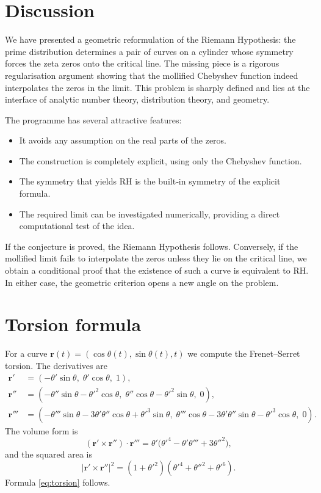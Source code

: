 \documentclass[12pt,a4paper]{article}
\begin{document}
\section{Discussion}

We have presented a geometric reformulation of the Riemann Hypothesis: the prime
distribution determines a pair of curves on a cylinder whose symmetry forces the
zeta zeros onto the critical line.  The missing piece is a rigorous regularisation
argument showing that the mollified Chebyshev function indeed interpolates the
zeros in the limit.  This problem is sharply defined and lies at the interface of
analytic number theory, distribution theory, and geometry.

The programme has several attractive features:
\begin{itemize}
\item It avoids any assumption on the real parts of the zeros.
\item The construction is completely explicit, using only the Chebyshev function.
\item The symmetry that yields RH is the built‑in symmetry of the explicit formula.
\item The required limit can be investigated numerically, providing a direct
      computational test of the idea.
\end{itemize}

If the conjecture is proved, the Riemann Hypothesis follows.  Conversely, if the
mollified limit fails to interpolate the zeros unless they lie on the critical
line, we obtain a conditional proof that the existence of such a curve is
equivalent to RH.  In either case, the geometric criterion opens a new angle
on the problem.

\appendix

\section{Torsion formula}

For a curve \(\mathbf{r}(t)=(\cos\theta(t),\sin\theta(t),t)\) we compute the
Frenet–Serret torsion.  The derivatives are
\begin{align*}
\mathbf{r}' &= (-\theta'\sin\theta,\; \theta'\cos\theta,\; 1),\\
\mathbf{r}'' &= (-\theta''\sin\theta - \theta'^2\cos\theta,\;
                 \theta''\cos\theta - \theta'^2\sin\theta,\; 0),\\
\mathbf{r}''' &= (-\theta'''\sin\theta - 3\theta'\theta''\cos\theta
                  + \theta'^3\sin\theta,\;
                  \theta'''\cos\theta - 3\theta'\theta''\sin\theta
                  - \theta'^3\cos\theta,\; 0).
\end{align*}
The volume form is
\[
(\mathbf{r}'\times\mathbf{r}'')\cdot\mathbf{r}''' =
\theta' \bigl( \theta'^4 - \theta'\theta''' + 3\theta''^2 \bigr),
\]
and the squared area is
\[
|\mathbf{r}'\times\mathbf{r}''|^2 =
(1+\theta'^2)(\theta'^4 + \theta''^2 + \theta'^6).
\]
Formula \eqref{eq:torsion} follows.
\end{document}
